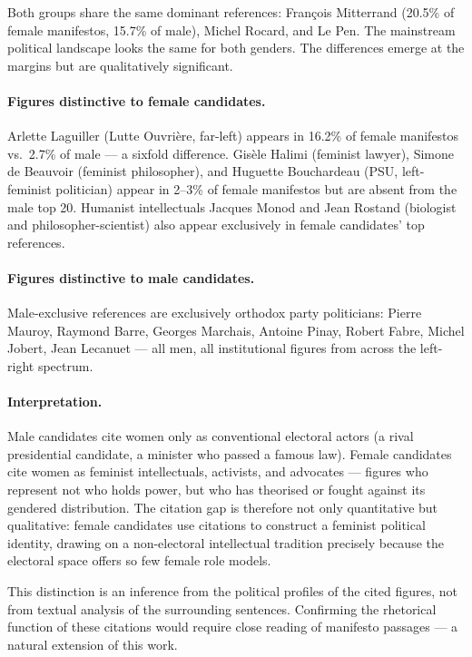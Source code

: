 \documentclass{article}
\begin{document}
Both groups share the same dominant references: François Mitterrand
(20.5\% of female manifestos, 15.7\% of male), Michel Rocard, and Le Pen.
The mainstream political landscape looks the same for both genders. The
differences emerge at the margins but are qualitatively significant.

\paragraph{Figures distinctive to female candidates.}
Arlette Laguiller (Lutte Ouvrière, far-left) appears in 16.2\% of female
manifestos vs.\ 2.7\% of male — a sixfold difference. Gisèle Halimi (feminist
lawyer), Simone de Beauvoir (feminist philosopher), and Huguette Bouchardeau
(PSU, left-feminist politician) appear in 2--3\% of female manifestos but are
absent from the male top 20. Humanist intellectuals Jacques Monod and Jean
Rostand (biologist and philosopher-scientist) also appear exclusively in female
candidates' top references.

\paragraph{Figures distinctive to male candidates.}
Male-exclusive references are exclusively orthodox party politicians: Pierre
Mauroy, Raymond Barre, Georges Marchais, Antoine Pinay, Robert Fabre, Michel
Jobert, Jean Lecanuet — all men, all institutional figures from across the
left-right spectrum.

\paragraph{Interpretation.}
Male candidates cite women only as conventional electoral actors (a rival
presidential candidate, a minister who passed a famous law). Female candidates
cite women as feminist intellectuals, activists, and advocates — figures who
represent not who holds power, but who has theorised or fought against its
gendered distribution. The citation gap is therefore not only quantitative but
qualitative: female candidates use citations to construct a feminist political
identity, drawing on a non-electoral intellectual tradition precisely because
the electoral space offers so few female role models.

This distinction is an inference from the political profiles of the cited
figures, not from textual analysis of the surrounding sentences. Confirming the
rhetorical function of these citations would require close reading of manifesto
passages — a natural extension of this work.
\end{document}
